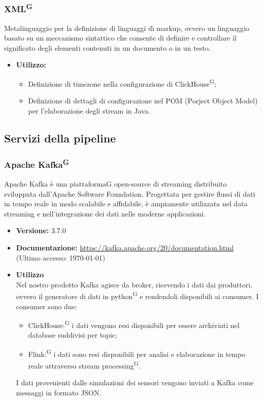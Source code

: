 \documentclass[8pt]{article}
\newcommand{\glossterm}[1]{#1\textsuperscript{G}} %
\begin{document}
    \subsubsection{\glossterm{XML}}
 Metalinguaggio per la definizione di linguaggi di markup, ovvero un linguaggio basato su un meccanismo sintattico che consente di definire e controllare il significato degli elementi contenuti in un documento o in un testo.
\begin{itemize}
    \item \textbf{Utilizzo:}
    \begin{itemize}
        \item Definizione di timezone nella configurazione di \glossterm{ClickHouse};
        \item Definizione di dettagli di configurazione nel POM (Porject Object Model) per l'elaborazione degli stream in Java.
    \end{itemize}
\end{itemize}
\subsection{Servizi della pipeline}
\subsubsection{Apache \glossterm{Kafka}}
Apache Kafka è una piattaformaG open-source di streaming distribuito sviluppata
dall’Apache Software Foundation. Progettata per gestire flussi di dati in tempo reale in modo scalabile e affidabile, è ampiamente utilizzata nel data streaming e nell’integrazione dei dati nelle moderne applicazioni.
\begin{itemize}
    \item \textbf{Versione:} 3.7.0
    \item \textbf{Documentazione:} \href{https://kafka.apache.org/20/documentation.html}{\color{myblue}https://kafka.apache.org/20/documentation.html} (Ultimo accesso: \today)
    \item \textbf{Utilizzo} 
    \\Nel nostro prodotto Kafka agisce da broker, ricevendo i dati dai produttori, ovvero il generatore di dati in \glossterm{python} e rendendoli disponibili ai consumer. I consumer sono due:
    \begin{itemize}
        \item \glossterm{ClickHouse:} i dati vengono resi disponibili per essere archiviati nel database suddivisi per topic;
        \item \glossterm{Flink:} i dati sono resi disponibili per analisi e elaborazione in tempo reale attraverso \glossterm{stream processing}.
    \end{itemize}
    I dati provenienti dalle simulazioni dei sensori vengono inviati a Kafka come messaggi in formato JSON.
\end{itemize}
\end{document}
